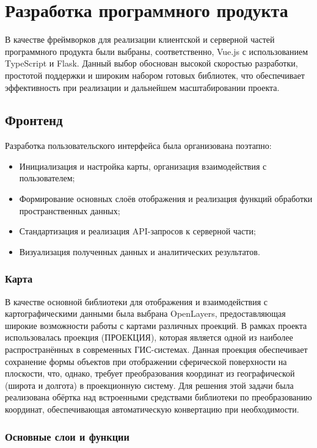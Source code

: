 \chapter{Разработка программного продукта}

В качестве фреймворков для реализации клиентской и серверной частей программного продукта были выбраны, соответственно, Vue.js с использованием TypeScript и Flask. Данный выбор обоснован высокой скоростью разработки, простотой поддержки и широким набором готовых библиотек, что обеспечивает эффективность при реализации и дальнейшем масштабировании проекта.

\section{Фронтенд}

Разработка пользовательского интерфейса была организована поэтапно:

\begin{itemize}
	\item Инициализация и настройка карты, организация взаимодействия с пользователем;
	\item Формирование основных слоёв отображения и реализация функций обработки пространственных данных;
	\item Стандартизация и реализация API-запросов к серверной части;
	\item Визуализация полученных данных и аналитических результатов.
\end{itemize}

\subsection*{Карта}

В качестве основной библиотеки для отображения и взаимодействия с картографическими данными была выбрана OpenLayers, предоставляющая широкие возможности работы с картами различных проекций. В рамках проекта использовалась проекция (ПРОЕКЦИЯ), которая является одной из наиболее распространённых в современных ГИС-системах. Данная проекция обеспечивает сохранение формы объектов при отображении сферической поверхности на плоскости, что, однако, требует преобразования координат из географической (широта и долгота) в проекционную систему. Для решения этой задачи была реализована обёртка над встроенными средствами библиотеки по преобразованию координат, обеспечивающая автоматическую конвертацию при необходимости.

\subsection*{Основные слои и функции}

